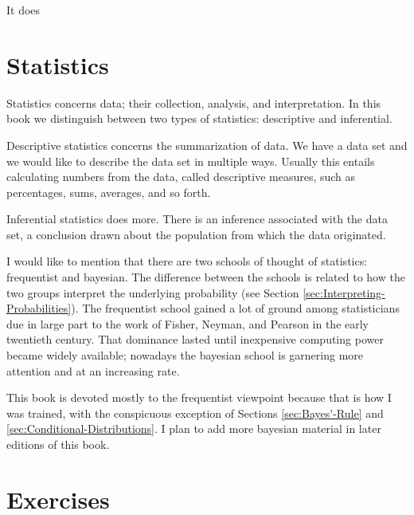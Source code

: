 \documentclass{scrbook}
\begin{document}
It does
\section{Statistics}
\label{sec-1-2}


Statistics concerns data; their collection, analysis, and interpretation. In this book we distinguish between two types of statistics: descriptive and inferential. 

Descriptive statistics concerns the summarization of data. We have a data set and we would like to describe the data set in multiple ways. Usually this entails calculating numbers from the data, called descriptive measures, such as percentages, sums, averages, and so forth.

Inferential statistics does more. There is an inference associated with the data set, a conclusion drawn about the population from which the data originated.

I would like to mention that there are two schools of thought of statistics: frequentist and bayesian. The difference between the schools is related to how the two groups interpret the underlying probability (see Section \ref{sec:Interpreting-Probabilities}). The frequentist school gained a lot of ground among statisticians due in large part to the work of Fisher, Neyman, and Pearson in the early twentieth century. That dominance lasted until inexpensive computing power became widely available; nowadays the bayesian school is garnering more attention and at an increasing rate.

This book is devoted mostly to the frequentist viewpoint because that is how I was trained, with the conspicuous exception of Sections \ref{sec:Bayes'-Rule} and \ref{sec:Conditional-Distributions}. I plan to add more bayesian material in later editions of this book.

\newpage{}
\section{Exercises}
\label{sec-1-3}

\setcounter{thm}{0}
\end{document}
